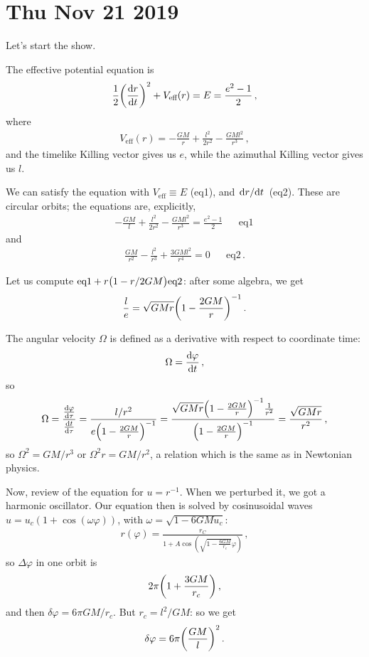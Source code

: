 \documentclass[main.tex]{subfiles}
\begin{document}
\section*{Thu Nov 21 2019}

Let's start the show. 

The effective potential equation is 
%
\begin{align}
  \frac{1}{2} \qty(\dv{r}{t})^2 + V _{\text{eff}} (r)
  = E = \frac{e^2-1}{2} 
\,,
\end{align}
%
where 
%
\begin{align}
  V _{\text{eff}}(r) 
  = - \frac{GM}{r} + \frac{l^2}{2r^2} - \frac{GMl^2}{r^3}
\,,
\end{align}
%
and the timelike Killing vector gives us \(e\), while the azimuthal Killing vector gives us \(l\). 

We can satisfy the equation with \(V _{\text{eff}} \equiv E\) (eq1), and \(\dv*{r}{t}\) (eq2). These are circular orbits; the equations are, explicitly, 
%
\begin{align}
  -\frac{GM}{l} + \frac{l^2}{2r^2} - \frac{GMl^2}{r^3} = \frac{e^2-1}{2} && \text{eq1}
\,
\end{align}
%
and 
%
\begin{align}
  \frac{GM}{r^2} - \frac{l^2}{r^3} + \frac{3GMl^2}{r^{4}}=0
  && \text{eq2}
\,.
\end{align}
%

Let us compute \(\text{eq1} + r \qty(1 - r/2GM) \text{eq2}\): after some algebra, we get 
%
\begin{align}
  \frac{l}{e} = \sqrt{GMr} \qty(1 - \frac{2GM}{r})^{-1}
\,.
\end{align}

The angular velocity \(\Omega \) is defined as a derivative with respect to coordinate time: 
%
\begin{align}
  \Omega = \dv{\varphi }{t}
\,,
\end{align}
%
so 
%
\begin{align}
  \Omega = \frac{\dv{\varphi }{\tau }}{\dv{t}{\tau }}
  = \frac{l/r^2}{e \qty(1 - \frac{2GM}{r})^{-1}}
  = \frac{\sqrt{GMr} \qty(1- \frac{2GM}{r})^{-1} \frac{1}{r^2}}{\qty(1 - \frac{2GM}{r})^{-1}} = \frac{\sqrt{GMr}}{r^2}
\,,
\end{align}
%
so \(\Omega^2= GM/ r^3\) or \(\Omega^2 r = GM / r^2\), a relation which is the same as in Newtonian physics. 

Now, review of the equation for \(u = r^{-1}\). When we perturbed it, we got a harmonic oscillator. Our equation then is solved by cosinusoidal waves \(u = u_c (1+\cos(\omega \varphi ))\), with \(\omega = \sqrt{1 - 6GMu_c}\): 
%
\begin{align}
  r(\varphi) = \frac{r_C}{1 + A \cos(\sqrt{1 - \frac{6GM}{r_c}}\varphi )}
\,,
\end{align}
%
so \(\Delta \varphi \) in one orbit is 
%
\begin{align}
  2 \pi \qty(1 + \frac{3GM}{r_c})
\,,
\end{align}
%
and then \(\delta \varphi  = 6 \pi GM / r_c\). But \(r_c = l^2/ GM\): so we get 
%
\begin{align}
  \delta \varphi = 6 \pi \qty(\frac{GM}{l})^2
\,. 
\end{align}
%
\end{document}
